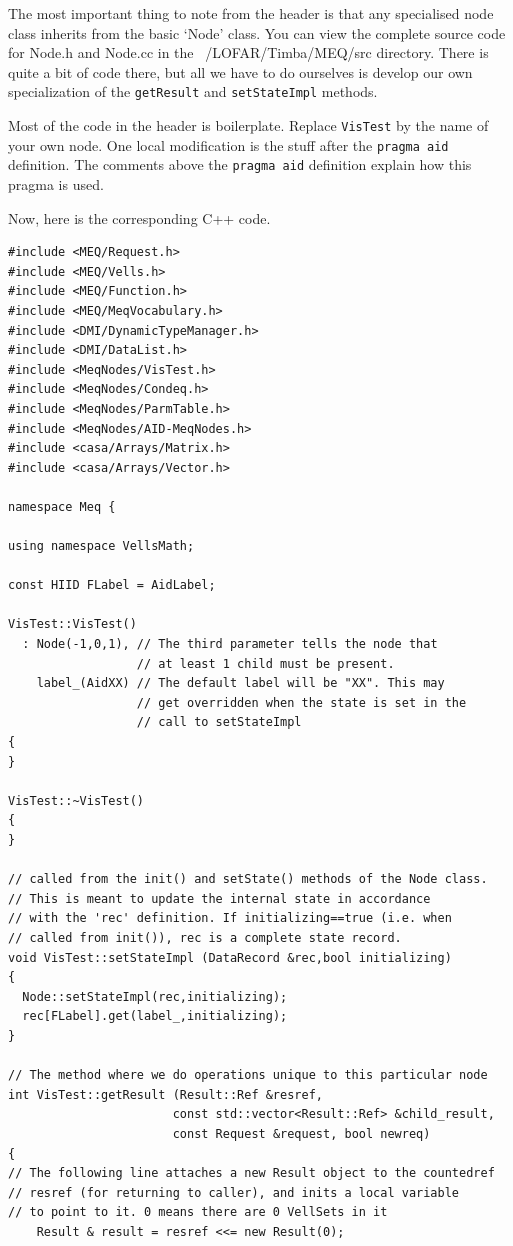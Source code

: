 \documentclass[10pt]{article}
\begin{document}
The most important thing to note from the header is that any
specialised node class inherits from the basic `Node' class.
You can view the complete source code for Node.h and Node.cc
in the ~/LOFAR/Timba/MEQ/src directory. There is quite a
bit of code there, but all we have to do ourselves is develop
our own specialization of the {\tt getResult} and 
{\tt setStateImpl} methods. 

Most of the code in the header is boilerplate. Replace {\tt VisTest}
by the name of your own node. One local modification is the
stuff after the {\tt pragma aid} definition. The comments
above the {\tt pragma aid} definition explain how this pragma is
used.

Now, here is the corresponding C++ code.

\begin{verbatim}
#include <MEQ/Request.h>
#include <MEQ/Vells.h>
#include <MEQ/Function.h>
#include <MEQ/MeqVocabulary.h>
#include <DMI/DynamicTypeManager.h>
#include <DMI/DataList.h>
#include <MeqNodes/VisTest.h>
#include <MeqNodes/Condeq.h>
#include <MeqNodes/ParmTable.h>
#include <MeqNodes/AID-MeqNodes.h>
#include <casa/Arrays/Matrix.h>
#include <casa/Arrays/Vector.h>

namespace Meq {

using namespace VellsMath;

const HIID FLabel = AidLabel;

VisTest::VisTest()
  : Node(-1,0,1), // The third parameter tells the node that
                  // at least 1 child must be present.
    label_(AidXX) // The default label will be "XX". This may
                  // get overridden when the state is set in the
                  // call to setStateImpl
{
}

VisTest::~VisTest()
{
}

// called from the init() and setState() methods of the Node class.
// This is meant to update the internal state in accordance 
// with the 'rec' definition. If initializing==true (i.e. when 
// called from init()), rec is a complete state record.
void VisTest::setStateImpl (DataRecord &rec,bool initializing)
{
  Node::setStateImpl(rec,initializing);
  rec[FLabel].get(label_,initializing);
}

// The method where we do operations unique to this particular node
int VisTest::getResult (Result::Ref &resref, 
                       const std::vector<Result::Ref> &child_result,
                       const Request &request, bool newreq)
{
// The following line attaches a new Result object to the countedref
// resref (for returning to caller), and inits a local variable 
// to point to it. 0 means there are 0 VellSets in it
	Result & result = resref <<= new Result(0);


\end{verbatim}
\end{document}
